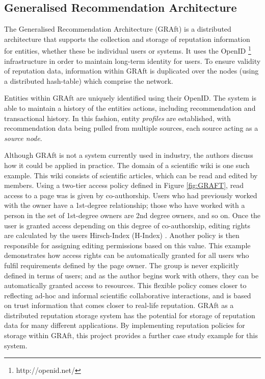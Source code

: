 \subsection{Generalised Recommendation Architecture}

The Generalised Recommendation Architecture (GRAft) \cite{graft_paper} is a distributed architecture that supports the collection and storage of reputation information for entities, whether these be individual users or systems. It uses the OpenID \footnote{http://openid.net/} infrastructure in order to maintain long-term identity for users. To ensure validity of reputation data, information within GRAft is duplicated over the nodes (using a distributed hash-table) which comprise the network. 

Entities within GRAft are uniquely identified using their OpenID. The system is able to maintain a history of the entities actions, including recommendation and transactional history. In this fashion, entity \textit{profiles} are established, with recommendation data being pulled from multiple sources, each source acting as a \textit{source node}.



Although GRAft is not a system currently used in industry, the authors discuss how it could be applied in practice. The domain of a scientific wiki is one such example. This wiki consists of scientific articles, which can be read and edited by members. Using a two-tier access policy defined in Figure \ref{fig:GRAFT}, read access to a page was is given by co-authorship. Users who had previously worked with the owner have a 1st-degree relationship; those who have worked with a person in the set of 1st-degree owners are 2nd degree owners, and so on. Once the user is granted access depending on this degree of co-authorship, editing rights are calculated by the users Hirsch-Index (H-Index) \cite{hirsch2005index}. Another policy is then responsible for assigning editing permissions based on this value. This example demonstrates how access rights can be automatically granted for all users who fulfil requirements defined by the page owner. The group is never explicitly defined in terms of users; and as the author begins work with others, they can be automatically granted access to resources. This flexible policy comes closer to reflecting ad-hoc and informal scientific collaborative interactions, and is based on trust information that comes closer to real-life reputation. GRAft as a distributed reputation storage system has the potential for storage of reputation data for many different applications. By implementing reputation policies for storage within GRAft, this project provides a further case study example for this system.

